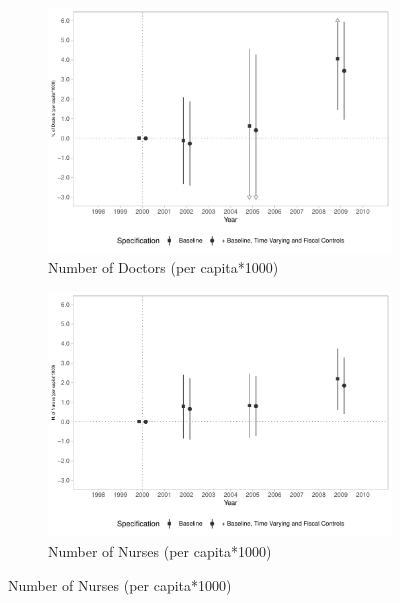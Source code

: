 \begin{figure}[h!]
    \begin{center}
    \caption{Effects on Health Human Resources}\label{fig:10}
    \begin{subfigure}{0.48\textwidth}
        \caption{\scriptsize Number of Doctors (per capita*1000)}\label{fig:10a}
        \centering
\includegraphics[width=\textwidth]{plots/ams_hr_superior_pcapita_dist_ec29_baseline_dist_ec29_baseline_10.pdf}
    \end{subfigure}
    \begin{subfigure}{0.48\textwidth}
        \centering
        \caption{\scriptsize Number of Nurses (per capita*1000)}\label{fig:10b}
        \includegraphics[width=\textwidth]{plots/ams_hr_technician_pcapita_dist_ec29_baseline_dist_ec29_baseline_10.pdf}

\end{subfigure}
\end{center}
\end{figure}
